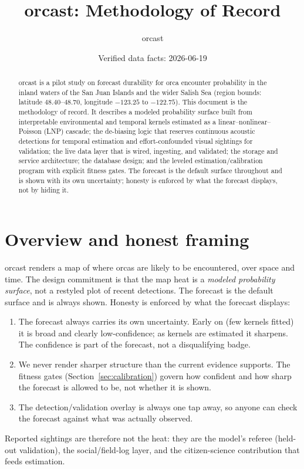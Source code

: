 \documentclass[11pt]{article}
\title{orcast: Methodology of Record}
\author{orcast}
\date{Verified data facts: 2026-06-19}
\begin{document}
\maketitle

\begin{abstract}
orcast is a pilot study on forecast durability for orca encounter probability in
the inland waters of the San Juan Islands and the wider Salish Sea
(region bounds: latitude $48.40$--$48.70$, longitude $-123.25$ to $-122.75$).
This document is the methodology of record. It describes a modeled probability
surface built from interpretable environmental and temporal kernels estimated as
a linear--nonlinear--Poisson (LNP) cascade; the de-biasing logic that reserves
continuous acoustic detections for temporal estimation and effort-confounded
visual sightings for validation; the live data layer that is wired, ingesting,
and validated; the storage and service architecture; the database design; and
the leveled estimation/calibration program with explicit fitness gates. The
forecast is the default surface throughout and is shown with its own uncertainty;
honesty is enforced by what the forecast displays, not by hiding it.
\end{abstract}

\tableofcontents

\section{Overview and honest framing}
orcast renders a map of where orcas are likely to be encountered, over space and
time. The design commitment is that the map heat is a \emph{modeled probability
surface}, not a restyled plot of recent detections. The forecast is the default
surface and is always shown. Honesty is enforced by what the forecast displays:
\begin{enumerate}
  \item The forecast always carries its own uncertainty. Early on (few kernels
  fitted) it is broad and clearly low-confidence; as kernels are estimated it
  sharpens. The confidence is part of the forecast, not a disqualifying badge.
  \item We never render sharper structure than the current evidence supports.
  The fitness gates (Section~\ref{sec:calibration}) govern how confident and how
  sharp the forecast is allowed to be, not whether it is shown.
  \item The detection/validation overlay is always one tap away, so anyone can
  check the forecast against what was actually observed.
\end{enumerate}
Reported sightings are therefore not the heat: they are the model's referee
(held-out validation), the social/field-log layer, and the citizen-science
contribution that feeds estimation.
\end{document}
